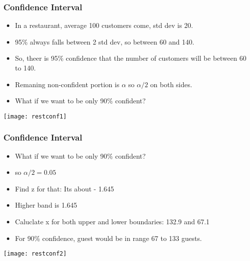 \begin{frame}[fragile]\frametitle{Confidence Interval}
\begin{itemize}
\item In a restaurant, average 100 customers come, std dev is 20.
\item 95\% always falls between 2 std dev, so between 60 and 140.
\item So, theer is 95\% confidence that the number of customers will be between 60 to 140.
\item Remaning non-confident portion is $\alpha$ so $\alpha/2$ on both sides.
\item What if we want to be only 90\% confident?
\end{itemize}
\begin{center}
\texttt{[image: restconf1]}
\end{center}
\end{frame}

\begin{frame}[fragile]\frametitle{Confidence Interval}
\begin{itemize}
\item What if we want to be only 90\% confident?
\item so $\alpha/2 = 0.05$
\item Find z for that: Its about - 1.645
\item Higher band is 1.645
\item Caluclate x for both upper and lower boundaries: 132.9 and 67.1
\item For 90\% confidence, guest would be in range 67 to 133 guests.
\end{itemize}
\begin{center}
\texttt{[image: restconf2]}
\end{center}
\end{frame}



